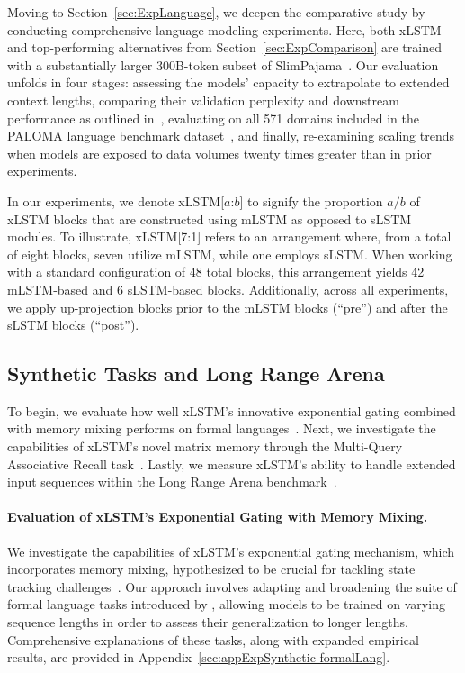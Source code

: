 Moving to Section~\ref{sec:ExpLanguage}, we deepen the comparative study by conducting comprehensive language modeling experiments. Here, both xLSTM and top-performing alternatives from Section~\ref{sec:ExpComparison} are trained with a substantially larger 300B-token subset of SlimPajama~\citep{Soboleva:23}. Our evaluation unfolds in four stages: assessing the models' capacity to extrapolate to extended context lengths, comparing their validation perplexity and downstream performance as outlined in~\citep{Sutawika:24}, evaluating on all 571 domains included in the PALOMA language benchmark dataset~\citep{Magnusson:23arxivshort}, and finally, re-examining scaling trends when models are exposed to data volumes twenty times greater than in prior experiments.

\label{sec:xlstm_blocks_notation}
In our experiments, we denote xLSTM[$a$:$b$] to signify the proportion $a/b$ of xLSTM blocks that are constructed using mLSTM as opposed to sLSTM modules. To illustrate, xLSTM[7:1] refers to an arrangement where, from a total of eight blocks, seven utilize mLSTM, while one employs sLSTM. When working with a standard configuration of 48 total blocks, this arrangement yields 42 mLSTM-based and 6 sLSTM-based blocks. Additionally, across all experiments, we apply up-projection blocks prior to the mLSTM blocks (“pre”) and after the sLSTM blocks (“post”).

\subsection{Synthetic Tasks and Long Range Arena}
\label{sec:ExpSyntethic}
To begin, we evaluate how well xLSTM's innovative exponential gating combined with memory mixing performs on formal languages~\citep{Deletang:23}. Next, we investigate the capabilities of xLSTM’s novel matrix memory through the Multi-Query Associative Recall task~\citep{Arora:23arxiv}. Lastly, we measure xLSTM's ability to handle extended input sequences within the Long Range Arena benchmark~\citep{Tay:21}.

\paragraph{Evaluation of xLSTM's Exponential Gating with Memory Mixing.} We investigate the capabilities of xLSTM's exponential gating mechanism, which incorporates memory mixing, hypothesized to be crucial for tackling state tracking challenges~\citep{Merrill:24, Merrill:23}. Our approach involves adapting and broadening the suite of formal language tasks introduced by \citet{Deletang:23}, allowing models to be trained on varying sequence lengths in order to assess their generalization to longer lengths. Comprehensive explanations of these tasks, along with expanded empirical results, are provided in Appendix~\ref{sec:appExpSynthetic-formalLang}. 

